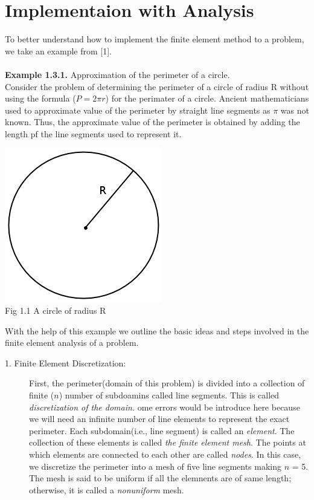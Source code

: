 \documentclass{report}
\numberwithin{equation}{chapter}
\begin{document}
\section{Implementaion with Analysis}
\begin{spacing}{1.5}
To better understand how to implement the finite element method to a problem, we take an example from [1].\\ \\
\textbf{Example 1.3.1.} Approximation of the perimeter of a circle.\\
Consider the problem of determining the perimeter of a circle of radius R without using the formula ($P = 2\pi r$) for the perimater of a circle. Ancient mathematicians used to approximate value of the perimeter by straight line segments as $\pi$ was not known. Thus, the approximate value of the perimeter is obtained by adding the length pf the line segments used to represent it.\\
\begin{center}
\includegraphics[scale=0.5]{circle}\\
Fig 1.1 A circle of radius R
\end{center}
With the help of this example we outline the basic ideas and steps involved in the finite element analysis of a problem.\\
\begin{description}
  \item[1. Finite Element Discretization:] First, the perimeter(domain of this problem) is divided into a collection of finite ($n$) number of subdoamins called line segments. This is called \textsl{discretization of the domain.} ome errors would be introduce here because we will need an infinite number of line elements to represent the exact perimeter. Each subdomain(i.e., line segment) is called an \textsl{element}. The collection of these elements is called \textsl{the finite element mesh}. The points at which elements are connected to each other are called \textsl{nodes}. In this case, we discretize the perimeter into a mesh of five line segments making $n$ = 5. The mesh is said to be uniform if all the elemnents are of same length; otherwise, it is called a \textsl{nonuniform} mesh.

\end{description}
\end{spacing}
\end{document}
